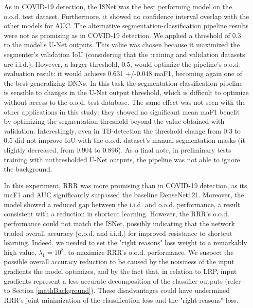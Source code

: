 \documentclass[fleqn,10pt]{wlscirep}
\begin{document}
{As in COVID-19 detection, the ISNet was the best performing model on the o.o.d. test dataset. Furthermore, it showed no confidence interval overlap with the other models for AUC. The alternative segmentation-classification pipeline results were not as promising as in COVID-19 detection. We applied a threshold of 0.3 to the model's U-Net outputs. This value was chosen because it maximized the segmenter's validation IoU (considering that the training and validation datasets are i.i.d.). However, a larger threshold, 0.5, would optimize the pipeline's o.o.d. evaluation result: it would achieve 0.631 +/-0.048 maF1, becoming again one of the best generalizing DNNs. In this task the segmentation-classification pipeline is sensible to changes in the U-Net output threshold, which is difficult to optimize without access to the o.o.d. test database. The same effect was not seen with the other applications in this study: they showed no significant mean maF1 benefit by optimizing the segmentation threshold beyond the value obtained with validation. Interestingly, even in TB-detection the threshold change from 0.3 to 0.5 did not improve IoU with the o.o.d. dataset's manual segmentation masks (it slightly decreased, from 0.904 to 0.896). As a final note, in preliminary tests training with unthresholded U-Net outputs, the pipeline was not able to ignore the background.

In this experiment, RRR was more promising than in COVID-19 detection, as its maF1 and AUC significantly surpassed the baseline DenseNet121. Moreover, the model showed a reduced gap between the i.i.d. and o.o.d. performance, a result consistent with a reduction in shortcut learning. However, the RRR's o.o.d. performance could not match the ISNet, possibly indicating that the network traded overall accuracy (o.o.d. and i.i.d.) for improved resistance to shortcut learning. Indeed, we needed to set the "right reasons" loss weight\cite{RRR} to a remarkably high value, $\lambda_{1}=10^{8}$, to maximize RRR's o.o.d. performance. We suspect the possible overall accuracy reduction to be caused by the noisiness of the input gradients the model optimizes\cite{LRPRobustness}, and by the fact that, in relation to LRP, input gradients represent a less accurate decomposition of the classifier outputs (refer to Section \ref{mathBackground}). These disadvantages could have undermined RRR's joint minimization of the classification loss and the "right reasons" loss.

}
\end{document}
